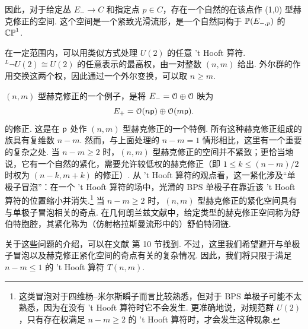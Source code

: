 因此，对于给定丛 $E_-\to C$ 和指定点 $p\in C$，存在一个自然的在该点作 (1,0) 型赫克修正的空间.
这个空间是一个紧致光滑流形，是一个自然同构于 $\Bbb P(E_{-,p})$ 的 $\CP^1$.

在一定范围内，可以用类似方式处理 $U(2)$ 的任意 't Hooft 算符.
$^L\neg U(2)\cong U(2)$ 的任意表示的最高权，由一对整数 $(n,m)$ 给出.
外尔群的作用交换这两个权，因此通过一个外尔变换，可以取 $n\geq m$.

$(n,m)$ 型赫克修正的一个例子，是将 $E_-=\O\oplus \O$ 映为
\begin{equation}\label{doffy}E_+=\O(n\pp)\oplus \O(m\pp). \end{equation}
的修正.
这是在 $\pp$ 处作 $(n,m)$ 型赫克修正的一个特例.
所有这种赫克修正组成的族具有复维数 $n-m$.
然而，与上面处理的 $n-m=1$ 情形相比，这里有一个重要的复杂之处.
当 $n-m\geq 2$ 时，$(n,m)$ 型赫克修正的空间并不紧致；更恰当地说，它有一个自然的紧化，需要允许较低权的赫克修正（即 $1\leq k\leq (n-m)/2$ 时权为 $(n-k,m+k)$ 的修正）.
从 't Hooft 算符的观点看，这一紧化涉及“单极子冒泡”：在一个 't Hooft 算符的场中，光滑的 BPS 单极子在靠近该 't Hooft 算符的位置缩小并消失.\footnote{这类冒泡对于四维杨--米尔斯瞬子而言比较熟悉，但对于 BPS 单极子可能不太熟悉，因为在没有 't Hooft 算符时它不会发生.
更准确地说，对规范群 $U(2)$，只有存在权满足 $n-m\geq 2$ 的 't Hooft 算符时，才会发生这种现象.}
当 $n-m\geq 2$ 时，$(n,m)$ 型赫克修正的紧化空间具有与单极子冒泡相关的奇点.
在几何朗兰兹文献中，给定类型的赫克修正空间称为舒伯特胞腔，其紧化称为（仿射格拉斯曼流形中的）舒伯特闭链.

关于这些问题的介绍，可以在文献 \cite{KW} 第 10 节找到.
不过，这里我们希望避开与单极子冒泡以及赫克修正紧化空间的奇点有关的复杂情况.
因此，我们将只限于满足 $n-m\leq 1$ 的 't Hooft 算符 $T(n,m)$.

